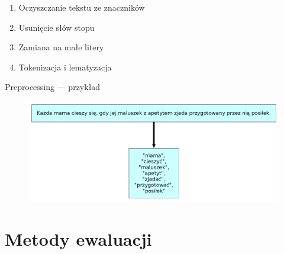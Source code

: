 \documentclass{beamer}
\begin{document}
	\begin{frame}
		\begin{enumerate}
			\item Oczyszczanie tekstu ze znaczników
			\item Usunięcie słów stopu
			\item Zamiana na małe litery
			\item Tokenizacja i lematyzacja %
		\end{enumerate}
	\end{frame}
	\begin{frame}{Preprocessing --- przykład}
		\begin{figure}
			\centering
			\includegraphics[width=1\textwidth]{img/lemmatisation.png}
		\end{figure}
	\end{frame}
	\section{Metody ewaluacji}
	
\end{document}
